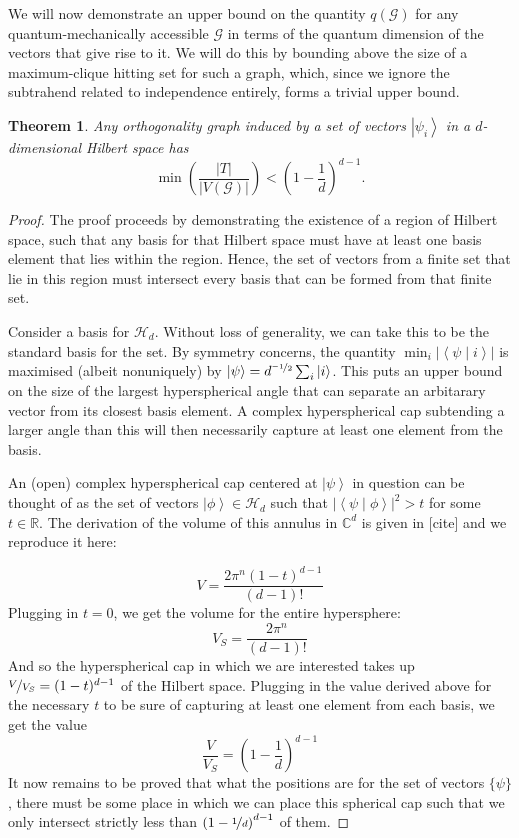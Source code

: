 \documentclass{amsart}
\newtheorem{thm}{Theorem}
\theoremstyle{definition}
\newcommand{\ket}[1]{{\left\vert{#1}\right\rangle}}
\newcommand{\braket}[2]{{\left< {#1} \middle\vert {#2}\right>}}
\newcommand{\sprod}[2]{\left|\left< {#1} \middle| {#2} \right>\right|}
\begin{document}
We will now demonstrate an upper bound on the quantity $q(\mathcal{G})$ for any quantum-mechanically accessible $\mathcal{G}$ in terms of the quantum dimension of the vectors that give rise to it. We will do this by bounding above the size of a maximum-clique hitting set for such a graph, which, since we ignore the subtrahend related to independence entirely, forms a trivial upper bound.
\begin{thm}
Any orthogonality graph induced by a set of vectors $\ket{\psi_i}$ in a $d$-dimensional Hilbert space has
\begin{equation}
\min \left(\frac{|T|}{|V(\mathcal{G})|}\right) < \left(1-\frac1d\right)^{d-1}.
\end{equation}
\end{thm}
\begin{proof}
The proof proceeds by demonstrating the existence of a region of Hilbert space, such that any basis for that Hilbert space must have at least one basis element that lies within the region. Hence, the set of vectors from a finite set that lie in this region must intersect every basis that can be formed from that finite set.

Consider a basis for $\mathcal{H}_d$. Without loss of generality, we can take this to be the standard basis for the set. By symmetry concerns, the quantity $\min_i \left|\braket{\psi}{i}\right|$ is maximised (albeit nonuniquely) by $\ket{\psi}=d^{\nicefrac{-1}{2}}\sum_i\ket{i}$. This puts an upper bound on the size of the largest hyperspherical angle that can separate an arbitarary vector from its closest basis element. A complex hyperspherical cap subtending a larger angle than this will then necessarily capture at least one element from the basis.

An (open) complex hyperspherical cap centered at $\ket{\psi}$ in question can be thought of as the set of vectors $\ket{\phi}\in\mathcal{H}_d$ such that $\sprod{\psi}{\phi}^2> t$ for some $t\in\mathbb{R}$. The derivation of the volume of this annulus in $\mathbb{C}^d$ is given in [cite] and we reproduce it here:

\begin{equation}V=\frac{2\pi^n(1-t)^{d-1}}{(d-1)!}\end{equation}
Plugging in $t=0$, we get the volume for the entire hypersphere:
\begin{equation}V_S=\frac{2\pi^n}{(d-1)!}\end{equation}
And so the hyperspherical cap in which we are interested takes up $\nicefrac{V}{V_S}=(1-t)^{d-1}$ of the Hilbert space. Plugging in the value derived above for the necessary $t$ to be sure of capturing at least one element from each basis, we get the value
\begin{equation}
\frac{V}{V_S}=\left(1-\frac1d \right)^{d-1}
\end{equation}
It now remains to be proved that what the positions are for the set of vectors $\{\psi\}$, there must be some place in which we can place this spherical cap such that we only intersect strictly less than $\left(1-\nicefrac1d \right)^{d-1}$ of them. 


\end{proof}
\end{document}
